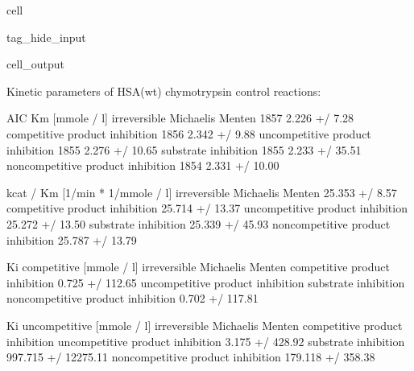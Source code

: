 \documentclass[letterpaper,10pt,english]{jupyterBook}
\begin{document}
\begin{sphinxuseclass}{cell}
\begin{sphinxuseclass}{tag_hide_input}
\begin{sphinxVerbatimOutput}
\begin{sphinxuseclass}{cell_output}
\begin{sphinxVerbatim}[commandchars=\\\{\}]
Kinetic parameters of HSA(wt) chymotrypsin control reactions:
\end{sphinxVerbatim}

\begin{sphinxVerbatim}[commandchars=\\\{\}]
                                     AIC    Km [mmole / l]  \PYGZbs{}
irreversible Michaelis Menten      \PYGZhy{}1857   2.226 +/\PYGZhy{} 7.28\PYGZpc{}   
competitive product inhibition     \PYGZhy{}1856   2.342 +/\PYGZhy{} 9.88\PYGZpc{}   
uncompetitive product inhibition   \PYGZhy{}1855  2.276 +/\PYGZhy{} 10.65\PYGZpc{}   
substrate inhibition               \PYGZhy{}1855  2.233 +/\PYGZhy{} 35.51\PYGZpc{}   
non\PYGZhy{}competitive product inhibition \PYGZhy{}1854  2.331 +/\PYGZhy{} 10.00\PYGZpc{}   

                                   kcat / Km [1/min * 1/mmole / l]  \PYGZbs{}
irreversible Michaelis Menten                     25.353 +/\PYGZhy{} 8.57\PYGZpc{}   
competitive product inhibition                   25.714 +/\PYGZhy{} 13.37\PYGZpc{}   
uncompetitive product inhibition                 25.272 +/\PYGZhy{} 13.50\PYGZpc{}   
substrate inhibition                             25.339 +/\PYGZhy{} 45.93\PYGZpc{}   
non\PYGZhy{}competitive product inhibition               25.787 +/\PYGZhy{} 13.79\PYGZpc{}   

                                   Ki competitive [mmole / l]  \PYGZbs{}
irreversible Michaelis Menten                               \PYGZhy{}   
competitive product inhibition              0.725 +/\PYGZhy{} 112.65\PYGZpc{}   
uncompetitive product inhibition                            \PYGZhy{}   
substrate inhibition                                        \PYGZhy{}   
non\PYGZhy{}competitive product inhibition          0.702 +/\PYGZhy{} 117.81\PYGZpc{}   

                                   Ki uncompetitive [mmole / l]  
irreversible Michaelis Menten                                 \PYGZhy{}  
competitive product inhibition                                \PYGZhy{}  
uncompetitive product inhibition              3.175 +/\PYGZhy{} 428.92\PYGZpc{}  
substrate inhibition                      997.715 +/\PYGZhy{} 12275.11\PYGZpc{}  
non\PYGZhy{}competitive product inhibition          179.118 +/\PYGZhy{} 358.38\PYGZpc{}  
\end{sphinxVerbatim}


\end{sphinxuseclass}
\end{sphinxVerbatimOutput}
\end{sphinxuseclass}
\end{sphinxuseclass}
\end{document}
